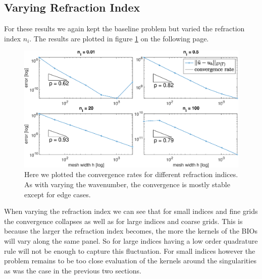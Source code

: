 \documentclass[a4paper, oneside]{thirdparty_stylesheets/discothesis}
\begin{document}
\subsection{Varying Refraction Index}
For these results we again kept the baseline problem but varied the refraction index $n_i$.
The results are plotted in figure \ref{fig:refraction} on the following page.
\begin{figure} [!ht]
	\centering
	\includegraphics[width=\columnwidth]{figures/refraction.eps}
	\caption{
		Here we plotted the convergence rates for different refraction indices.
	As with varying the wavenumber, the convergence is mostly stable except for edge cases.}
	\label{fig:refraction}
\end{figure}
When varying the refraction index we can see that for small indices and fine grids the convergence collapses as well as for large indices and coarse grids.
This is because the larger the refraction index becomes, the more the kernels of the BIOs will vary along the same panel.
So for large indices having a low order quadrature rule will not be enough to capture this fluctuation.
For small indices however the problem remains to be too close evaluation of the kernels around the singularities as was the case in the previous two sections.
\end{document}
